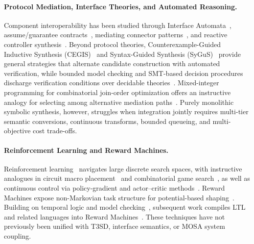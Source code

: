 \paragraph{Protocol Mediation, Interface Theories, and Automated Reasoning.}
Component interoperability has been studied through Interface Automata~\cite{deAlfaroHenzinger2001}, assume/guarantee contracts~\cite{BenvenisteEtAl2018}, mediating connector patterns~\cite{SpalazzeseInverardi2010}, and reactive controller synthesis~\cite{PnueliRosner1989}.  Beyond protocol theories, Counterexample-Guided Inductive Synthesis (CEGIS)~\cite{SolarLezama2008Sketch} and Syntax-Guided Synthesis (SyGuS)~\cite{AlurEtAl2013SyGuS} provide general strategies that alternate candidate construction with automated verification, while bounded model checking and SMT-based decision procedures discharge verification conditions over decidable theories~\cite{BaierKatoen2008}.  Mixed-integer programming for combinatorial join-order optimization offers an instructive analogy for selecting among alternative mediation paths~\cite{trummer2017solving}.  Purely monolithic symbolic synthesis, however, struggles when integration jointly requires multi-tier semantic conversions, continuous transforms, bounded queueing, and multi-objective cost trade-offs.

\paragraph{Reinforcement Learning and Reward Machines.}
Reinforcement learning~\cite{SuttonBarto2018} navigates large discrete search spaces, with instructive analogues in circuit macro placement~\cite{Mirhoseini2021} and combinatorial game search~\cite{Silver2018AlphaZero}, as well as continuous control via policy-gradient and actor--critic methods~\cite{Schulman2017PPO, Haarnoja2018SAC}.  Reward Machines expose non-Markovian task structure for potential-based shaping~\cite{ToroIcarte2018, ToroIcarte2022, NgHaradaRussell1999}.  Building on temporal logic and model checking~\cite{Pnueli1977, BaierKatoen2008}, subsequent work compiles LTL and related languages into Reward Machines~\cite{Camacho2019LTL}.  These techniques have not previously been unified with T3SD, interface semantics, or MOSA system coupling.

